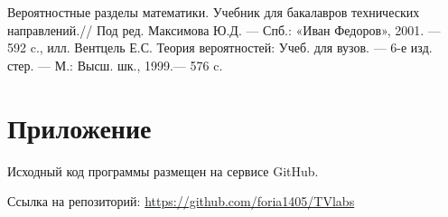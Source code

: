 \documentclass[12pt]{article}
\begin{document}
\newpage

\begin{thebibliography}{}
	  Вероятностные разделы математики. Учебник для бакалавров технических направлений.// Под ред. Максимова Ю.Д. — Спб.: «Иван Федоров», 2001. — 592 c., илл.
	  Вентцель Е.С. Теория вероятностей: Учеб. для вузов. — 6-е изд. стер. — М.: Высш. шк., 1999.— 576 c.
\end{thebibliography}
\newpage
\appendix


\section{Приложение}
\label{sec:A}
\par Исходный код программы размещен на сервисе GitHub.
\par Ссылка на репозиторий: \url{https://github.com/foria1405/TVlabs}
\end{document}
